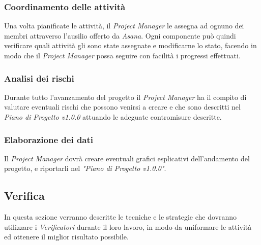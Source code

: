 \documentclass[12pt,a4paper,titlepage]{article}
\begin{document}
\subsubsection{Coordinamento delle attività}
Una volta pianificate le attività, il \textit{Project Manager} le assegna ad ognuno dei membri attraverso
l'ausilio offerto da \textit{Asana}. Ogni componente può quindi verificare quali attività 
gli sono state assegnate e modificarne lo stato, facendo in modo che il \textit{Project Manager} possa 
seguire con facilità i progressi effettuati.

\subsubsection{Analisi dei rischi}
Durante tutto l'avanzamento del progetto il \textit{Project Manager} ha il compito di valutare eventuali
rischi che possono venirsi a creare e che sono descritti nel \textit{Piano di Progetto v1.0.0} attuando 
le adeguate contromisure descritte.

\subsubsection{Elaborazione dei dati}
Il \textit{Project Manager} dovrà creare eventuali grafici esplicativi dell'andamento del progetto, e 
riportarli nel \textit{"Piano di Progetto v1.0.0"}.

\subsection{Verifica}
In questa sezione verranno descritte le tecniche e le strategie che dovranno utilizzare i \textit{Verificatori}
durante il loro lavoro, in modo da uniformare le attività ed ottenere il miglior risultato possibile.
\end{document}
